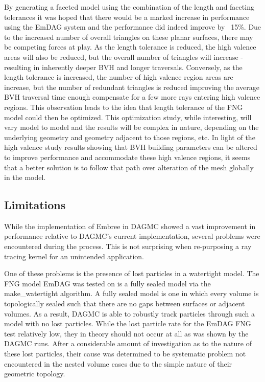 By generating a faceted model using the combination of the length and faceting
tolerances it was hoped that there would be a marked increase in performance
using the EmDAG system and the performance did indeed improve by ~15\%. Due to
the increased number of overall triangles on these planar surfaces, there may be
competing forces at play. As the length tolerance is reduced, the high valence
areas will also be reduced, but the overall number of triangles will increase -
resulting in inherently deeper BVH and longer traversals. Conversely, as the
length tolerance is increased, the number of high valence region areas are
increase, but the number of redundant triangles is reduced improving the average
BVH traversal time enough compensate for a few more rays entering high valence
regions. This observation leads to the idea that length tolerance of the FNG
model could then be optimized. This optimization study, while interesting, will
vary model to model and the results will be complex in nature, depending on the
underlying geometry and geometry adjacent to those regions, etc. In light of the
high valence study results showing that BVH building parameters can be altered
to improve performance and accommodate these high valence regions, it seems that
a better solution is to follow that path over alteration of the mesh globally in
the model. 

\subsection{Limitations}\label{sec:emdag_limitations}

While the implementation of Embree in DAGMC showed a vast improvement in
performance relative to DAGMC's current implementation, several problems were
encountered during the process. This is not surprising when re-purposing a ray
tracing kernel for an unintended application.

One of these problems is the presence of lost particles in a watertight
model. The FNG model EmDAG was tested on is a fully sealed model via the
make\_watertight algorithm. A fully sealed model is one in which every volume is
topologically sealed such that there are no gaps between surfaces or adjacent
volumes. As a result, DAGMC is able to robustly track particles through such a
model with no lost particles. While the lost particle rate for the EmDAG FNG
test relatively low, they in theory should not occur at all as was shown by the
DAGMC runs. After a considerable amount of investigation as to the nature of
these lost particles, their cause was determined to be systematic problem not
encountered in the nested volume cases due to the simple nature of their
geometric topology.

